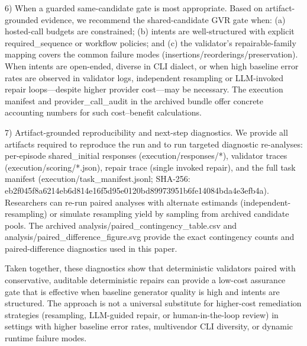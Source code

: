 \documentclass[conference]{IEEEtran}
\begin{document}
6) When a guarded same-candidate gate is most appropriate. Based on artifact-grounded evidence, we recommend the shared-candidate GVR gate when: (a) hosted-call budgets are constrained; (b) intents are well-structured with explicit required\_sequence or workflow policies; and (c) the validator's repairable-family mapping covers the common failure modes (insertions/reorderings/preservation). When intents are open-ended, diverse in CLI dialect, or when high baseline error rates are observed in validator logs, independent resampling or LLM-invoked repair loops---despite higher provider cost---may be necessary. The execution manifest and provider\_call\_audit in the archived bundle offer concrete accounting numbers for such cost--benefit calculations.

7) Artifact-grounded reproducibility and next-step diagnostics. We provide all artifacts required to reproduce the run and to run targeted diagnostic re-analyses: per-episode shared\_initial responses (execution/responses/*), validator traces (execution/scoring/*.json), repair trace (single invoked repair), and the full task manifest (execution/task\_manifest.jsonl; SHA-256: eb2f045f\allowbreak{}8a6214eb\allowbreak{}6d814e16\allowbreak{}f5d95e01\allowbreak{}20bd8997\allowbreak{}3951b6fe\allowbreak{}14084bda\allowbreak{}4e3efb4a). Researchers can re-run paired analyses with alternate estimands (independent-resampling) or simulate resampling yield by sampling from archived candidate pools. The archived analysis/paired\_contingency\_table.csv and analysis/paired\_difference\_figure.svg provide the exact contingency counts and paired-difference diagnostics used in this paper.

Taken together, these diagnostics show that deterministic validators paired with conservative, auditable deterministic repairs can provide a low-cost assurance gate that is effective when baseline generator quality is high and intents are structured. The approach is not a universal substitute for higher-cost remediation strategies (resampling, LLM-guided repair, or human-in-the-loop review) in settings with higher baseline error rates, multivendor CLI diversity, or dynamic runtime failure modes.
\end{document}
